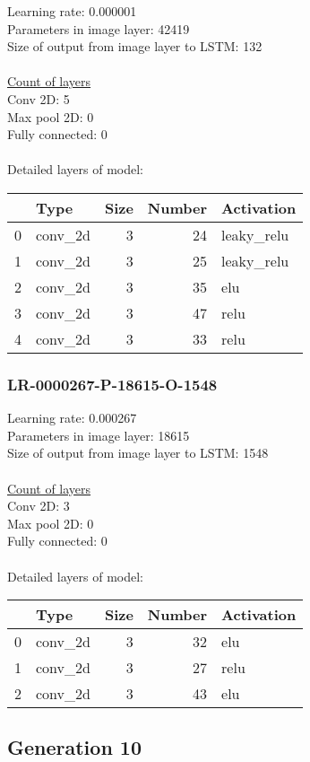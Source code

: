 Learning rate: 0.000001
\\Parameters in image layer: 42419
\\Size of output from image layer to LSTM: 132
\\\\\underline{Count of layers} 
\\Conv 2D:           5\\Max pool 2D:      0\\Fully connected:  0
\\\\Detailed layers of model: \\\begin{tabular}{rlrrl}
\hline
    & Type    &   Size &   Number & Activation   \\
\hline
  0 & conv\_2d &      3 &       24 & leaky\_relu   \\
  1 & conv\_2d &      3 &       25 & leaky\_relu   \\
  2 & conv\_2d &      3 &       35 & elu          \\
  3 & conv\_2d &      3 &       47 & relu         \\
  4 & conv\_2d &      3 &       33 & relu         \\
\hline
\end{tabular}\subsubsection*{LR-0000267-P-18615-O-1548}
Learning rate: 0.000267
\\Parameters in image layer: 18615
\\Size of output from image layer to LSTM: 1548
\\\\\underline{Count of layers} 
\\Conv 2D:           3\\Max pool 2D:      0\\Fully connected:  0
\\\\Detailed layers of model: \\\begin{tabular}{rlrrl}
\hline
    & Type    &   Size &   Number & Activation   \\
\hline
  0 & conv\_2d &      3 &       32 & elu          \\
  1 & conv\_2d &      3 &       27 & relu         \\
  2 & conv\_2d &      3 &       43 & elu          \\
\hline
\end{tabular}\subsection{Generation 10}
